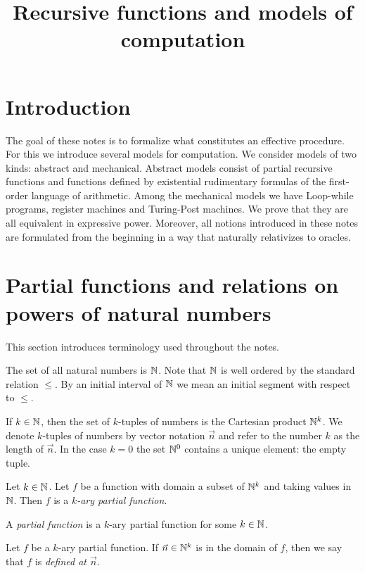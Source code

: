 \documentclass[10pt]{amsart}
\begin{document}
\title{Recursive functions and models of computation}
\date{}
\maketitle

\section{Introduction}
\noindent
The goal of these notes is to formalize what constitutes an effective procedure. For this we introduce several models for computation. We consider models of two kinds: abstract and mechanical. Abstract models consist of partial recursive functions and functions defined by existential rudimentary formulas of the first-order language of arithmetic. Among the mechanical models we have Loop-while programs, register machines and Turing-Post machines. We prove that they are all equivalent in expressive power. Moreover, all notions introduced in these notes are formulated from the beginning in a way that naturally relativizes to oracles.

\section{Partial functions and relations on powers of natural numbers}
\noindent
This section introduces terminology used throughout the notes.

The set of all natural numbers is ${\mathbb N}$. Note that ${\mathbb N}$ is well ordered by the standard relation $\leq$. By an initial interval of ${\mathbb N}$ we mean an initial segment with respect to $\leq$.

If $k \in {\mathbb N}$, then the set of $k$-tuples of numbers is the Cartesian product ${\mathbb N}^k$. We denote $k$-tuples of numbers by vector notation $\vec{n}$ and refer to the number $k$ as the length of $\vec{n}$. In the case $k = 0$ the set ${\mathbb N}^0$ contains a unique element: the empty tuple.

\begin{definition}
	Let $k\in {\mathbb N}$. Let $f$ be a function with domain a subset of ${\mathbb N}^k$ and taking values in ${\mathbb N}$. Then $f$ is a \textit{$k$-ary partial function}.
\end{definition}

\begin{definition}
	A \textit{partial function} is a $k$-ary partial function for some $k \in {\mathbb N}$.
\end{definition}

\begin{definition}
	Let $f$ be a $k$-ary partial function. If $\vec{n} \in {\mathbb N}^k$ is in the domain of $f$, then we say that $f$ is \textit{defined at $\vec{n}$}.
\end{definition}
\end{document}
